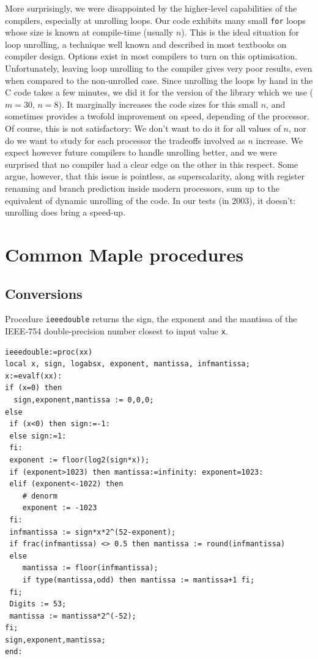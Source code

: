 More surprisingly, we were disappointed by the higher-level
capabilities of the compilers, especially at unrolling loops. Our code
exhibits many small \texttt{for} loops whose size is known at
compile-time (usually $n$). This is the ideal situation for loop
unrolling, a technique well known and described in most textbooks on
compiler design. Options exist in most compilers to turn on this
optimisation. Unfortunately, leaving loop unrolling to the compiler
gives very poor results, even when compared to the non-unrolled case.
Since unrolling the loops by hand in the C code takes a few minutes,
we did it for the version of the library which we use ($m=30$, $n=8$).
It marginally increases the code sizes for this small $n$, and
sometimes provides a twofold improvement on speed, depending of the
processor. Of course, this is not satisfactory: We don't want to do it
for all values of $n$, nor do we want to study for each processor the
tradeoffs involved as $n$ increase. We expect however future compilers
to handle unrolling better, and we were surprised that no compiler had
a clear edge on the other in this respect. Some argue, however, that
this issue is pointless, as superscalarity, along with register
renaming and branch prediction inside modern processors, sum up to the
equivalent of dynamic unrolling of the code. In our tests (in 2003), it
doesn't: unrolling does bring a speed-up.








\section{Common Maple procedures \label{section:commonMaple}}


\subsection{Conversions}





Procedure \texttt{ieeedouble} returns the sign, the exponent and the
mantissa of the IEEE-754 double-precision number closest to input
value \texttt{x}.

\begin{lstlisting}[caption={ieeedouble},firstnumber=1]
ieeedouble:=proc(xx) 
local x, sign, logabsx, exponent, mantissa, infmantissa; 
x:=evalf(xx):
if (x=0) then 
  sign,exponent,mantissa := 0,0,0; 
else 
 if (x<0) then sign:=-1:
 else sign:=1:
 fi:
 exponent := floor(log2(sign*x));
 if (exponent>1023) then mantissa:=infinity: exponent=1023:
 elif (exponent<-1022) then 
    # denorm
    exponent := -1023
 fi:
 infmantissa := sign*x*2^(52-exponent);
 if frac(infmantissa) <> 0.5 then mantissa := round(infmantissa)
 else
    mantissa := floor(infmantissa);
    if type(mantissa,odd) then mantissa := mantissa+1 fi;
 fi;
 Digits := 53;
 mantissa := mantissa*2^(-52);
fi;
sign,exponent,mantissa;
end:
\end{lstlisting}






